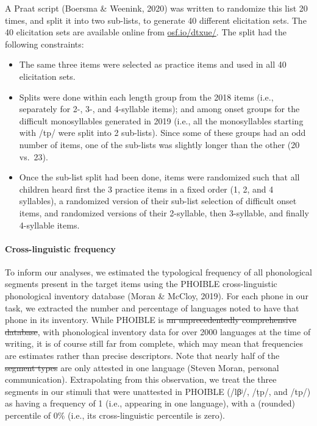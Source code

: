 \documentclass[ %
american, %
,man,floatsintext]{apa6} %
\providecommand{\tightlist}{%
	\setlength{\itemsep}{0pt}\setlength{\parskip}{0pt}} %
\let\oldparagraph\paragraph %
\renewcommand{\paragraph}[1]{\oldparagraph{#1}\mbox{}} %
\providecommand{\DIFaddtex}[1]{{\protect\color{blue}\uwave{#1}}} %
\providecommand{\DIFdeltex}[1]{{\protect\color{red}\sout{#1}}}                      %
\providecommand{\DIFaddbegin}{} %
\providecommand{\DIFaddend}{} %
\providecommand{\DIFdelbegin}{} %
\providecommand{\DIFdelend}{} %
\providecommand{\DIFadd}[1]{\texorpdfstring{\DIFaddtex{#1}}{#1}} %
\providecommand{\DIFdel}[1]{\texorpdfstring{\DIFdeltex{#1}}{}} %
\newcommand{\DIFscaledelfig}{0.5}
\newlength{\DIFdelgraphicswidth} %
\newlength{\DIFdelgraphicsheight} %
\newcommand{\DIFaddincludegraphics}[2][]{{\color{blue}\fbox{\DIFOincludegraphics[#1]{#2}}}} %
\newcommand{\DIFdelincludegraphics}[2][]{%
	\sbox{\DIFdelgraphicsbox}{\DIFOincludegraphics[#1]{#2}}%
	\settoboxwidth{\DIFdelgraphicswidth}{\DIFdelgraphicsbox} %
	\settoboxtotalheight{\DIFdelgraphicsheight}{\DIFdelgraphicsbox} %
	\scalebox{\DIFscaledelfig}{%
		\parbox[b]{\DIFdelgraphicswidth}{\usebox{\DIFdelgraphicsbox}\\[-\baselineskip] \rule{\DIFdelgraphicswidth}{0em}}\llap{\resizebox{\DIFdelgraphicswidth}{\DIFdelgraphicsheight}{%
				\setlength{\unitlength}{\DIFdelgraphicswidth}%
				\begin{picture}(1,1)%
				\thicklines\linethickness{2pt} %
				{\color[rgb]{1,0,0}\put(0,0){\framebox(1,1){}}}%
				{\color[rgb]{1,0,0}\put(0,0){\line( 1,1){1}}}%
				{\color[rgb]{1,0,0}\put(0,1){\line(1,-1){1}}}%
				\end{picture}%
			}\hspace*{3pt}}} %
} %
\DeclareRobustCommand{\DIFaddbegin}{\DIFOaddbegin \let\includegraphics\DIFaddincludegraphics} %
\DeclareRobustCommand{\DIFaddend}{\DIFOaddend \let\includegraphics\DIFOincludegraphics} %
\DeclareRobustCommand{\DIFdelbegin}{\DIFOdelbegin \let\includegraphics\DIFdelincludegraphics} %
\DeclareRobustCommand{\DIFdelend}{\DIFOaddend \let\includegraphics\DIFOincludegraphics} %
\begin{document}
A Praat script (Boersma \& Weenink, 2020) was written to randomize this list 20 times, and \DIFaddbegin \DIFadd{to }\DIFaddend split it into two sub-lists, to generate 40 different elicitation sets. The 40 elicitation sets are available online from \href{https://osf.io/dtxue/}{osf.io/dtxue/}. The split had the following constraints:

\begin{itemize}
	\tightlist
	\item
	The same three items were selected as practice items and used in all 40 elicitation sets.
	\item
	Splits were done within each length group from the 2018 items (i.e., separately for 2-, 3-, and 4-syllable items); and among onset groups for the difficult monosyllables generated in 2019 (i.e., all the monosyllables starting with /tp/ were split into 2 sub-lists). Since some of these groups had an odd number of items, one of the sub-lists was slightly longer than the other (20 vs.~23).
	\item
	Once the sub-list split had been done, items were randomized such that all children heard first the 3 practice items in a fixed order (1, 2, and 4 syllables), a randomized version of their sub-list selection of difficult onset items, and randomized versions of their 2-syllable, then 3-syllable, and finally 4-syllable items.
\end{itemize}

\DIFaddbegin \hypertarget{cross-linguistic-frequency}{%
	\paragraph{Cross-linguistic frequency}\label{cross-linguistic-frequency}}

\DIFaddend To inform our analyses, we estimated the typological frequency of all phonological segments present in the target items using the PHOIBLE cross-linguistic phonological inventory database (Moran \& McCloy, 2019). For each phone in our task, we extracted the number and percentage of languages noted to have that phone in its inventory. While PHOIBLE is \DIFdelbegin \DIFdel{an unprecedentedly comprehensive database}\DIFdelend \DIFaddbegin \DIFadd{a unprecedented in its scope}\DIFaddend , with phonological inventory data for over 2000 languages at the time of writing, it is of course still far from complete, which may mean that frequencies are estimates rather than precise descriptors. Note that nearly half of the \DIFdelbegin \DIFdel{segment types }\DIFdelend \DIFaddbegin \DIFadd{phones in PHOIBLE }\DIFaddend are only attested in one language (Steven Moran, personal communication). Extrapolating from this observation, we treat the three segments in our stimuli that were unattested in PHOIBLE (/lβʲ/, /ṭp/, and /tp/) as having a frequency of 1 (i.e., appearing in one language), with a (rounded) percentile of 0\% (i.e., its cross-linguistic percentile is zero).
\end{document}
